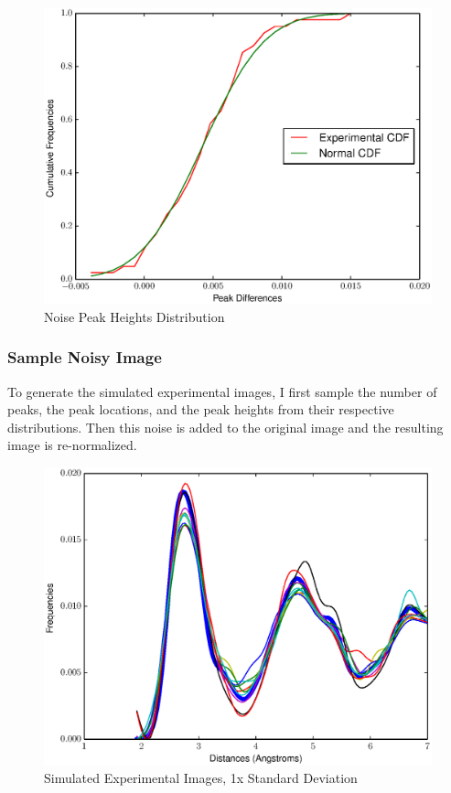 \documentclass[12pt,letterpaper]{article}
\begin{document}
\begin{figure}[ht]
  \begin{center}
    \includegraphics[scale=0.8]{figs/noise_peak_cdf.eps}
    \caption{Noise Peak Heights Distribution}
  \end{center}
\end{figure}
\clearpage

\subsubsection{Sample Noisy Image}
To generate the simulated experimental images, I first sample the number of
peaks, the peak locations, and the peak heights from their respective
distributions. Then this noise is added to the original image and the resulting
image is re-normalized.

\begin{figure}[ht]
  \begin{center}
    \includegraphics[scale=0.8]{figs/RandomImgs1x.eps}
    \caption{Simulated Experimental Images, 1x Standard Deviation}
  \end{center}
\end{figure}
\end{document}
